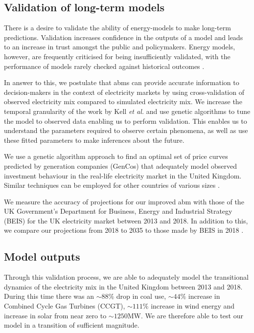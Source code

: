 \subsection{Validation of long-term models}

There is a desire to validate the ability of energy-models to make long-term predictions. Validation increases confidence in the outputs of a model and leads to an increase in trust amongst the public and policymakers. Energy models, however, are frequently criticised for being insufficiently validated, with the performance of models rarely checked against historical outcomes \cite{Beckman2011}.

In answer to this, we postulate that \acrshort{abm}s can provide accurate information to decision-makers in the context of electricity markets by using cross-validation of observed electricity mix compared to simulated electricity mix. We increase the temporal granularity of the work by Kell \textit{et al.} \cite{Kell} and use genetic algorithms to tune the model to observed data enabling us to perform validation. This enables us to understand the parameters required to observe certain phenomena, as well as use these fitted parameters to make inferences about the future. 




We use a genetic algorithm approach to find an optimal set of price curves predicted by generation companies (GenCos) that adequately model observed investment behaviour in the real-life electricity market in the United Kingdom. Similar techniques can be employed for other countries of various sizes \cite{Kell}. 

We measure the accuracy of projections for our improved \acrshort{abm} with those of the UK Government's Department for Business, Energy and Industrial Strategy (BEIS) for the UK electricity market between 2013 and 2018. In addition to this, we compare our projections from 2018 to 2035 to those made by BEIS in 2018 \cite{DBEIS2019}.




\subsection{Model outputs}
\label{elecsim:sec:results}

Through this validation process, we are able to adequately model the transitional dynamics of the electricity mix in the United Kingdom between 2013 and 2018. During this time there was an ${\sim}88\%$ drop in coal use, ${\sim}44\%$ increase in Combined Cycle Gas Turbines (CCGT), ${\sim}111\% $ increase in wind energy and increase in solar from near zero to ${\sim}1250$MW. We are therefore able to test our model in a transition of sufficient magnitude.

